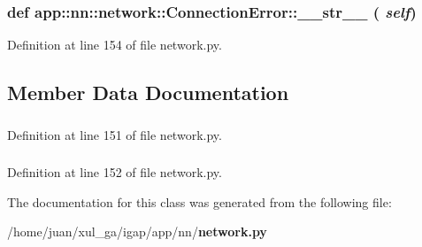 \subsubsection{\setlength{\rightskip}{0pt plus 5cm}def app::nn::network::ConnectionError::\_\-\_\-str\_\-\_\- ( {\em self})}\label{classapp_1_1nn_1_1network_1_1ConnectionError_5f84da436d4e7ced3d0e932812dabae1}




Definition at line 154 of file network.py.

\subsection{Member Data Documentation}
\subsubsection{}\label{classapp_1_1nn_1_1network_1_1ConnectionError_37cb4558fb4b0d461524aafad7ef9ee7}




Definition at line 151 of file network.py.
\subsubsection{}\label{classapp_1_1nn_1_1network_1_1ConnectionError_703e45bcd1bf007b794550b6e5ce91c5}




Definition at line 152 of file network.py.

The documentation for this class was generated from the following file:\begin{CompactItemize}
\item 
/home/juan/xul\_\-ga/igap/app/nn/{\bf network.py}\end{CompactItemize}
